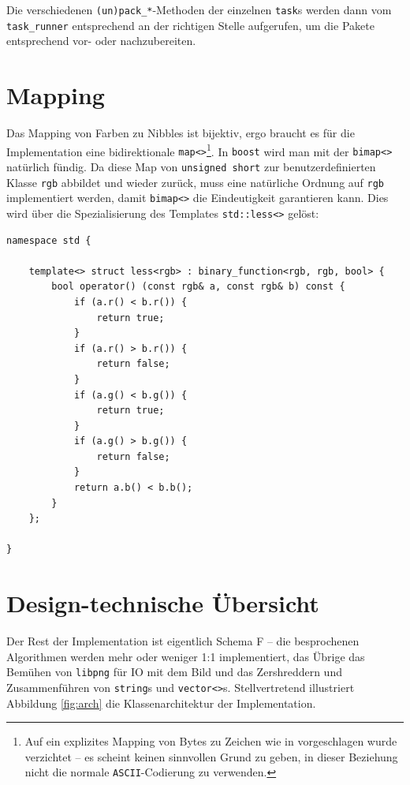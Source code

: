 \documentclass[11pt]{scrreprt} %
\theoremstyle{definition}
\begin{document}
Die verschiedenen {\tt (un)pack\_*}-Methoden der einzelnen {\tt task}s werden dann vom {\tt task\_runner} entsprechend an der richtigen Stelle aufgerufen, um die Pakete entsprechend vor- oder nachzubereiten.

\section{Mapping}

Das Mapping von Farben zu Nibbles ist bijektiv, ergo braucht es für die Implementation eine bidirektionale {\tt map<>}\footnote{Auf ein explizites Mapping von Bytes zu Zeichen wie in \cite{paper} vorgeschlagen wurde verzichtet -- es scheint keinen sinnvollen Grund zu geben, in dieser Beziehung nicht die normale {\tt ASCII}-Codierung zu verwenden.}. In {\tt boost} wird man mit der {\tt bimap<>} natürlich fündig. Da diese Map von {\tt unsigned short} zur benutzerdefinierten Klasse {\tt rgb} abbildet und wieder zurück, muss eine natürliche Ordnung auf {\tt rgb} implementiert werden, damit {\tt bimap<>} die Eindeutigkeit garantieren kann. Dies wird über die Spezialisierung des Templates {\tt std::less<>} gelöst:
\begin{lstlisting}
namespace std {

	template<> struct less<rgb> : binary_function<rgb, rgb, bool> {
		bool operator() (const rgb& a, const rgb& b) const {
			if (a.r() < b.r()) {
				return true;
			}
			if (a.r() > b.r()) {
				return false;
			}
			if (a.g() < b.g()) {
				return true;
			}
			if (a.g() > b.g()) {
				return false;
			}
			return a.b() < b.b();
		}
	};

}
\end{lstlisting}

\section{Design-technische Übersicht}

Der Rest der Implementation ist eigentlich Schema F -- die besprochenen Algorithmen werden mehr oder weniger 1:1 implementiert, das Übrige das Bemühen von {\tt libpng} für IO mit dem Bild und das Zershreddern und Zusammenführen von {\tt string}s und {\tt vector<>}s. Stellvertretend illustriert Abbildung \ref{fig:arch} die Klassenarchitektur der Implementation.
\end{document}
